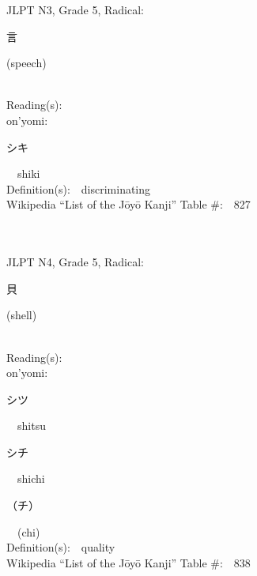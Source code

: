 \begin{multicols}{2}
{JLPT N3, Grade 5, Radical:\ \ {\begin{CJK}{UTF8}{min} 言 \end{CJK}} (speech) } \\
Reading(s):\ \ \\
{\hspace*{1em}}on'yomi:\ \ \\
{\hspace*{2em}}{\begin{CJK}{UTF8}{min} シキ \end{CJK}}\ \ shiki\ \ \\
Definition(s):\ \ discriminating \\
Wikipedia ``List of the J\=oy\=o Kanji'' Table \#:\ \ 827 \\
\ \ \\
{\fontsize{34pt}{40pt}  }\ \ \\  %
{JLPT N4, Grade 5, Radical:\ \ {\begin{CJK}{UTF8}{min} 貝 \end{CJK}} (shell) } \\
Reading(s):\ \ \\
{\hspace*{1em}}on'yomi:\ \ \\
{\hspace*{2em}}{\begin{CJK}{UTF8}{min} シツ \end{CJK}}\ \ shitsu\ \ \\
{\hspace*{2em}}{\begin{CJK}{UTF8}{min} シチ \end{CJK}}\ \ shichi\ \ \\
{\hspace*{2em}}{\begin{CJK}{UTF8}{min} （チ） \end{CJK}}\ \ (chi)\ \ \\
Definition(s):\ \ quality \\
Wikipedia ``List of the J\=oy\=o Kanji'' Table \#:\ \ 838 \\
\ \ \\
{\fontsize{34pt}{40pt}  }\ \ \\  %

\end{multicols}
